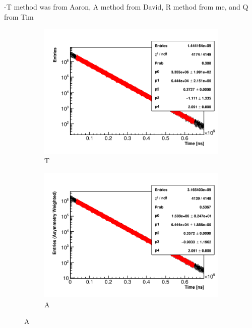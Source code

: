 -T method was from Aaron, A method from David, R method from me, and Q from Tim



\begin{figure}[]
\centering
    \begin{subfigure}[t]{0.45\textwidth}
        \centering
        \includegraphics[width=\textwidth]{Example_TMethod_Fit}
        \caption{T}
    \end{subfigure}
    \hspace{1mm}
    \begin{subfigure}[t]{0.45\textwidth}
        \centering
        \includegraphics[width=\textwidth]{Example_AMethod_Fit}
        \caption{A}
    \end{subfigure}%


\end{figure}
